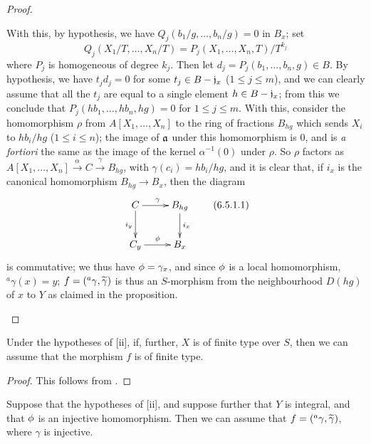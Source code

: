 \begin{proof}
\begin{enumerate}[label=(\roman*)]
        With this, by hypothesis, we have $Q_j(b_1/g,\ldots,b_n/g)=0$ in $B_x$;
        set
        \[
            Q_j(X_1/T,\ldots,X_n/T)=P_j(X_1,\ldots,X_n,T)/T^{k_j}
        \]
        where $P_j$ is homogeneous of degree $k_j$.
        Then let $d_j=P_j(b_1,\ldots,b_n,g)\in B$.
        By hypothesis, we have $t_jd_j=0$ for some $t_j\in B-\mathfrak{j}_x$ ($1\leq j\leq m$), and we can clearly assume that all the $t_j$ are equal to a single element $h\in B-\mathfrak{j}_x$;
        from this we conclude that $P_j(hb_1,\ldots,hb_n,hg)=0$ for $1\leq j\leq m$.
        With this, consider the homomorphism $\rho$ from $A[X_1,\ldots,X_n]$ to the ring of fractions $B_{hg}$ which sends $X_i$ to $hb_i/hg$ ($1\leq i\leq n$);
        the image of $\mathfrak{a}$ under this homomorphism is $0$, and is \emph{a fortiori} the same as the image of the kernel $\alpha^{-1}(0)$ under $\rho$.
        So $\rho$ factors as $A[X_1,\ldots,X_n]\xrightarrow{\alpha}C\xrightarrow{\gamma}B_{hg}$, with $\gamma(c_i)=hb_i/hg$, and it is clear that, if $i_x$ is the canonical homomorphism $B_{hg}\to B_x$, then the diagram
        \[
          \xymatrix{
            C\ar[r]^\gamma\ar[d]_{i_y} &
            B_{hg}\ar[d]^{i_x}\\
            C_y\ar[r]^\vphi &
            B_x
          }
          \tag{6.5.1.1}
        \]
        is commutative; we thus have $\phi=\gamma_x$, and since $\phi$ is a local homomorphism, $^a\gamma(x)=y$;
        $f=({}^a\gamma,{\widetilde{\gamma}})$ is thus an $S$-morphism from the neighbourhood $D(hg)$ of $x$ to $Y$ as claimed in the proposition.
\end{enumerate}
\end{proof}

\begin{cor}[6.5.2]
\label{1.6.5.2}
Under the hypotheses of [ii], if, further, $X$ is of finite type over $S$, then we can assume that the morphism $f$ is of finite type.
\end{cor}

\begin{proof}
\label{proof-1.6.5.2}
This follows from .
\end{proof}

\begin{cor}[6.5.3]
\label{1.6.5.3}
Suppose that the hypotheses of [ii], and suppose further that $Y$ is integral, and that $\phi$ is an injective homomorphism.
Then we can assume that $f=({}^a\gamma,{\widetilde{\gamma}})$, where $\gamma$ is injective.
\end{cor}

